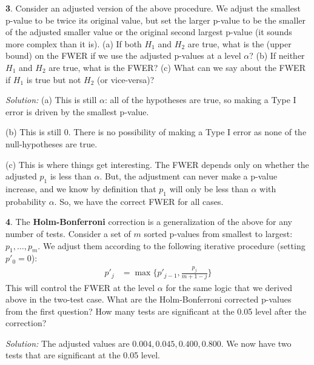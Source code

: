 \documentclass{tufte-handout}
\begin{document}
\textbf{3}. Consider an adjusted version of the above procedure. We adjust the smallest 
p-value to be twice its original value, but set the larger p-value to be
the smaller of the adjusted smaller value or the original second largest
p-value (it sounds more complex than it is). (a) If both $H_1$ and $H_2$
are true, what is the (upper bound) on the FWER if we use the adjusted
p-values at a level $\alpha$? (b) If neither $H_1$ and $H_2$ are true,
what is the FWER? (c) What can we say about the FWER if $H_1$ is true
but not $H_2$ (or vice-versa)?

\textit{Solution:} (a) This is still $\alpha$: all of the hypotheses are true, so making a
Type I error is driven by the smallest p-value.

(b) This is still $0$. There is no possibility of making a Type I error
as none of the null-hypotheses are true.

(c) This is where things get interesting. The FWER depends only on whether
the adjusted $p_1$ is less than $\alpha$. But, the adjustment can never 
make a p-value increase, and we know by definition that $p_1$ will only
be less than $\alpha$ with probability $\alpha$. So, we have the correct
FWER for all cases.

\textbf{4}. The \textbf{Holm-Bonferroni} correction is a generalization of the above
for any number of tests. Consider a set of $m$ sorted p-values from smallest
to largest: $p_1, \ldots, p_m$. We adjust them according to the following
iterative procedure (setting $p'_0 = 0$):
\begin{align*}
p'_j &= \max\{ p'_{j-1}, \frac{p_j}{m + 1 - j} \}
\end{align*}
This will control the FWER at the level $\alpha$ for the same logic that we
derived above in the two-test case. What are the Holm-Bonferroni corrected
p-values from the first question? How many tests are significant at the 0.05
level after the correction?

\textit{Solution:} The adjusted values are $0.004, 0.045, 0.400, 0.800$. We now have two tests
that are significant at the 0.05 level.
\end{document}

